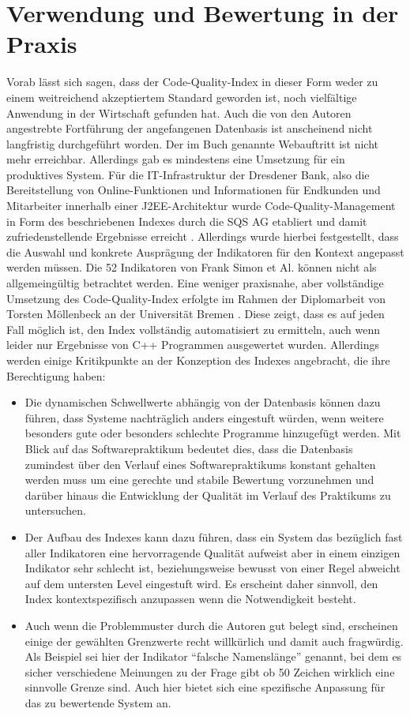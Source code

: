 \documentclass[da,ngerman]{stthesis}
\begin{document}
		\section{Verwendung und Bewertung in der Praxis}
			Vorab lässt sich sagen, dass der Code-Quality-Index in dieser Form weder zu einem weitreichend akzeptiertem Standard geworden ist, noch vielfältige Anwendung in der Wirtschaft gefunden hat. Auch die von den Autoren angestrebte Fortführung der angefangenen Datenbasis ist anscheinend nicht langfristig durchgeführt worden. Der im Buch genannte Webauftritt ist nicht mehr erreichbar. \newline
			Allerdings gab es mindestens eine Umsetzung für ein produktives System. Für die IT-Infrastruktur der Dresdener Bank, also die Bereitstellung von Online-Funktionen und Informationen für Endkunden und Mitarbeiter innerhalb einer J2EE-Architektur wurde Code-Quality-Management in Form des beschriebenen Indexes durch die SQS AG etabliert und damit zufriedenstellende Ergebnisse erreicht \cite{DresdnerBank}. Allerdings wurde hierbei festgestellt, dass die Auswahl und konkrete Ausprägung der Indikatoren für den Kontext angepasst werden müssen. Die 52 Indikatoren von Frank Simon et Al. können nicht als allgemeingültig betrachtet werden. \newline
			Eine weniger praxisnahe, aber vollständige Umsetzung des Code-Quality-Index erfolgte im Rahmen der Diplomarbeit von Torsten Möllenbeck an der Universität Bremen \cite{DAIndexUmsetzung}. Diese zeigt, dass es auf jeden Fall möglich ist, den Index vollständig automatisiert zu ermitteln, auch wenn leider nur Ergebnisse von C++ Programmen ausgewertet wurden. Allerdings werden einige Kritikpunkte an der Konzeption des Indexes angebracht, die ihre Berechtigung haben:
			\begin{itemize}
				\item Die dynamischen Schwellwerte abhängig von der Datenbasis können dazu führen, dass Systeme nachträglich anders eingestuft würden, wenn weitere besonders gute oder besonders schlechte Programme hinzugefügt werden. Mit Blick auf das Softwarepraktikum bedeutet dies, dass die Datenbasis zumindest über den Verlauf eines Softwarepraktikums konstant gehalten werden muss um eine gerechte und stabile Bewertung vorzunehmen und darüber hinaus die Entwicklung der Qualität im Verlauf des Praktikums zu untersuchen.
				\item Der Aufbau des Indexes kann dazu führen, dass ein System das bezüglich fast aller Indikatoren eine hervorragende Qualität aufweist aber in einem einzigen Indikator sehr schlecht ist, beziehungsweise bewusst von einer Regel abweicht auf dem untersten Level eingestuft wird. Es erscheint daher sinnvoll, den Index kontextspezifisch anzupassen wenn die Notwendigkeit besteht.
				\item Auch wenn die Problemmuster durch die Autoren gut belegt sind, erscheinen einige der gewählten Grenzwerte recht willkürlich und damit auch fragwürdig. Als Beispiel sei hier der Indikator "`falsche Namenslänge"' genannt, bei dem es sicher verschiedene Meinungen zu der Frage gibt ob 50 Zeichen wirklich eine sinnvolle Grenze sind. Auch hier bietet sich eine spezifische Anpassung für das zu bewertende System an.
			\end{itemize}
\end{document}
